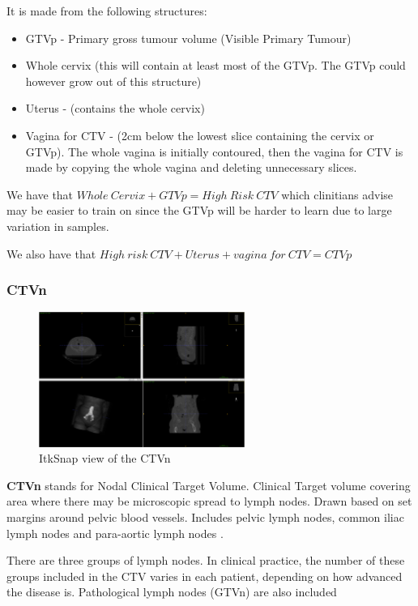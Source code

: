 \documentclass[11pt]{article}
\begin{document}
It is made from the following structures:

\begin{itemize}
    \item GTVp - Primary gross tumour volume (Visible Primary Tumour)
    \item Whole cervix (this will contain at least most of the GTVp. The GTVp could however grow out of this structure)
    \item Uterus - (contains the whole cervix)
    \item Vagina for CTV - (2cm below the lowest slice containing the cervix or GTVp). The whole vagina is initially contoured, then the vagina for CTV is made by copying the whole vagina and deleting unnecessary slices. 
\end{itemize}

We have that $Whole\ Cervix + GTVp = High\ Risk\ CTV$ which clinitians advise may be easier to train on since the GTVp will be harder to learn due to large variation in samples.

We also have that $High\ risk\ CTV + Uterus + vagina\ for\ CTV = CTVp$

\subsubsection{CTVn}

\begin{figure}[H]
    \centering
    \includegraphics[width=0.6\textwidth]{images/CTVn.png}
    \caption{ItkSnap view of the CTVn}\label{fig:CTVn}
\end{figure}

\textbf{CTVn} stands for Nodal Clinical Target Volume. Clinical Target volume covering area where there may be microscopic spread to lymph nodes. Drawn based on set margins around pelvic blood vessels. Includes pelvic lymph nodes, common iliac lymph nodes and para-aortic lymph nodes \cite{AMLART-data}.

There are three groups of lymph nodes. In clinical practice, the number of these groups included in the CTV varies in each patient, depending on how advanced the disease is. Pathological lymph nodes (GTVn) are also included
\end{document}

